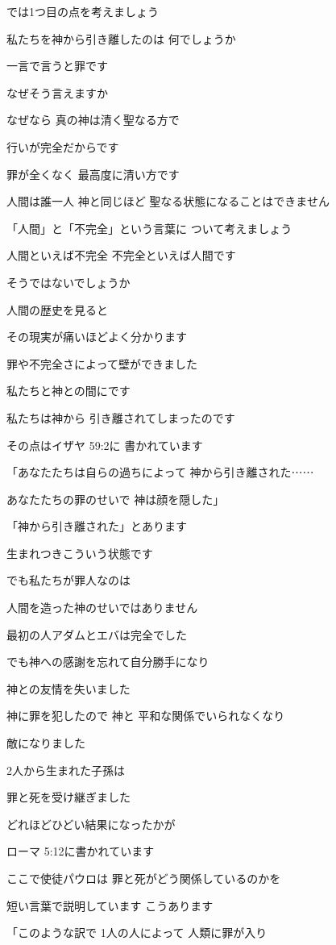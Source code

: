\documentclass[twocolumn]{jsarticle}
\begin{document}
では1つ目の点を考えましょう

私たちを神から引き離したのは
何でしょうか

一言で言うと罪です

なぜそう言えますか

なぜなら 真の神は清く聖なる方で

行いが完全だからです

罪が全くなく 最高度に清い方です

人間は誰一人 神と同じほど
聖なる状態になることはできません

「人間」と「不完全」という言葉に
ついて考えましょう

人間といえば不完全
不完全といえば人間です

そうではないでしょうか

人間の歴史を見ると

その現実が痛いほどよく分かります

罪や不完全さによって壁ができました

私たちと神との間にです

私たちは神から
引き離されてしまったのです

その点はイザヤ 59:2に
書かれています

「あなたたちは自らの過ちによって
神から引き離された⋯⋯

あなたたちの罪のせいで
神は顔を隠した」

「神から引き離された」とあります

生まれつきこういう状態です

でも私たちが罪人なのは

人間を造った神のせいではありません

最初の人アダムとエバは完全でした

でも神への感謝を忘れて自分勝手になり

神との友情を失いました

神に罪を犯したので 神と
平和な関係でいられなくなり

敵になりました

2人から生まれた子孫は

罪と死を受け継ぎました

どれほどひどい結果になったかが

ローマ 5:12に書かれています

ここで使徒パウロは
罪と死がどう関係しているのかを

短い言葉で説明しています
こうあります

「このような訳で 1人の人によって
人類に罪が入り
\end{document}
